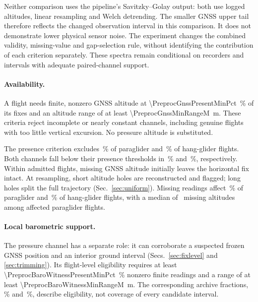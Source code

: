 Neither comparison uses the pipeline's Savitzky--Golay output: both use logged
altitudes, linear resampling and Welch detrending. The smaller GNSS upper tail
therefore reflects the changed observation interval in this comparison. It does
not demonstrate lower physical sensor noise. The experiment changes the combined
validity, missing-value and gap-selection rule, without identifying the contribution
of each criterion separately. These spectra remain conditional on recorders and
intervals with adequate paired-channel support.

\paragraph{Availability.}
A flight needs finite, nonzero GNSS altitude at
\SI{\PreprocGnssPresentMinPct}{\percent} of its fixes and an altitude range of at least
\SI{\PreprocGnssMinRangeM}{\metre}. These criteria reject incomplete or nearly constant
channels, including genuine flights with too little vertical excursion. No pressure
altitude is substituted.

\medskip
The presence criterion excludes \StatScanParaNoGnssPct\,\% of paraglider and
\StatScanHangNoGnssPct\,\% of hang-glider flights. Both channels fall below their
presence thresholds in \StatScanParaNoAltitudePct\,\% and
\StatScanHangNoAltitudePct\,\%, respectively. Within admitted flights, missing GNSS
altitude initially leaves the horizontal fix intact. At resampling, short altitude
holes are reconstructed and flagged; long holes split the full trajectory
(Sec.~\ref{sec:uniform}). Missing readings affect
\StatScanParaGnssMissFlightsPct\,\% of paraglider and
\StatScanHangGnssMissFlightsPct\,\% of hang-glider flights, with a median of
\StatScanParaGnssMissMedianFixes\ missing altitudes among affected paraglider flights.

\paragraph{Local barometric support.}
The pressure channel has a separate role: it can corroborate a suspected frozen GNSS
position and an interior ground interval (Secs.~\ref{sec:fixlevel} and
\ref{sec:trimming}). Its flight-level eligibility requires at least
\SI{\PreprocBaroWitnessPresentMinPct}{\percent} nonzero finite readings and a range of at
least \SI{\PreprocBaroWitnessMinRangeM}{\metre}. The corresponding archive fractions,
\StatPipeParaBaroWitnessPct\,\% and \StatPipeHangBaroWitnessPct\,\%, describe eligibility,
not coverage of every candidate interval.

